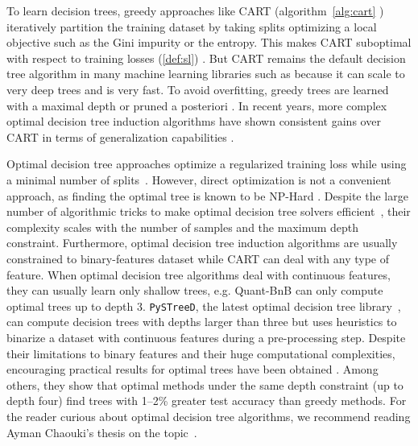 To learn decision trees, greedy approaches like CART (algorithm~\ref{alg:cart} \cite{breiman1984classification}) iteratively partition the training dataset by taking splits optimizing a local objective such as the Gini impurity or the entropy. 
This makes CART suboptimal with respect to training losses (\ref{def:sl}) \cite{Murthy}. 
But CART remains the default decision tree algorithm in many machine learning libraries such as \cite{scikit-learn,xgb,ke2017lightgbm,9533597} because it can scale to very deep trees and is very fast.
To avoid overfitting, greedy trees are learned with a maximal depth or pruned a posteriori \cite[chapter 3]{breiman1984classification}. 
In recent years, more complex optimal decision tree induction algorithms have shown consistent gains over CART in terms of generalization capabilities \cite{oct,verwer2017learning,murtree}.

Optimal decision tree approaches optimize a regularized training loss while using a minimal number of splits~\cite{oct,mfoct,binoct,quantbnb,murtree,blossom,pystreed,chaouki2024branchesfastdynamicprogramming}.
However, direct optimization is not a convenient approach, as finding the optimal tree is known to be NP-Hard \cite{npcomplete}. Despite the large number of algorithmic tricks to make optimal decision tree solvers efficient~\cite{murtree,quantbnb}, their complexity scales with the number of samples and the maximum depth constraint.
Furthermore, optimal decision tree induction algorithms are usually constrained to binary-features dataset while CART can deal with any type of feature. When optimal decision tree algorithms deal with continuous features, they can usually learn only shallow trees, e.g. Quant-BnB \cite{quantbnb} can only compute optimal trees up to depth 3.
\texttt{PySTreeD}, the latest optimal decision tree library~\cite{pystreed}, can compute decision trees with depths larger than three but uses heuristics to binarize a dataset with continuous features during a pre-processing step. %
Despite their limitations to binary features and their huge computational complexities, encouraging practical results for optimal trees have been obtained \cite{how-eff,lin2020generalized,costa2023recent,vanderlinden2024optimalgreedydecisiontrees}.
Among others, they show that optimal methods under the same depth constraint (up to depth four) find
trees with 1--2\% greater test accuracy than greedy methods. For the reader curious about optimal decision tree algorithms, we recommend reading Ayman Chaouki's thesis on the topic~\cite[chapter 2]{ayman}.

